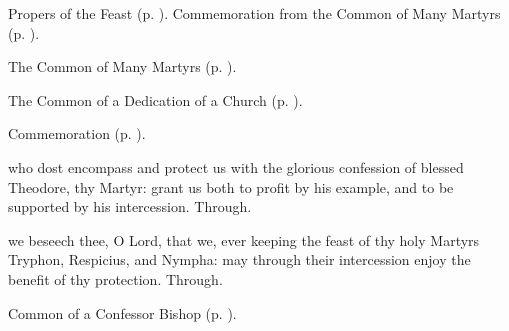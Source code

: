 \begin{rubric}
	Propers of the Feast (p. \pageref{AllHallows}). Commemoration  from the Common of Many Martyrs (p. \pageref{CommonMartyrsNotBishopsCollect}).
\end{rubric}


\clearpage
{}

\begin{rubric}
	The Common of Many Martyrs (p. \pageref{CommonMartyrsNotBishopsCollect}).
\end{rubric}




\begin{rubric}
	The Common of a Dedication of a Church (p. \pageref{CommonDedication}).
\end{rubric}

\begin{rubric}
	Commemoration  (p. \pageref{TheodoreTyroCollect}).
\end{rubric}



\memorialCollect\label{TheodoreTyroCollect}
 who dost encompass and protect us with the glorious confession of blessed Theodore, thy Martyr: grant us both to profit by his example, and to be supported by his intercession. Through.



\memorialCollect
{} we beseech thee, O Lord, that we, ever keeping the feast of thy holy Martyrs Tryphon, Respicius, and Nympha: may through their intercession enjoy the benefit of thy protection. Through.



\begin{rubric}
	Common of a Confessor Bishop (p. \pageref{CommonConfessorBishop}).
\end{rubric}

